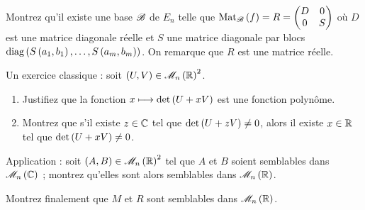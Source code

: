 \begin{corr}
\end{corr}

\begin{q}
Montrez qu'il existe une base \(\mathscr{B}\) de \(E_n\) telle que \(\Mat{f}=R=\begin{pmatrix}D & 0 \\ 0 & S\end{pmatrix}\) où \(D\) est une matrice diagonale réelle et \(S\) une matrice diagonale par blocs \(\operatorname{diag}\left(S\left(a_1,b_1\right),\dots,S\left(a_m,b_m\right)\right)\). On remarque que \(R\) est une matrice réelle.
\end{q}

\begin{corr}
\end{corr}

\begin{q}
Un exercice classique : soit \(\paren{U,V}\in\M{n}[\R]^2\).

\begin{enumerate}
    \item Justifiez que la fonction \(x\longmapsto\det\left(U+xV\right)\) est une fonction polynôme. \\
    \item Montrez que s'il existe \(z\in\mathbb{C}\) tel que \(\det\left(U+zV\right)\not=0\), alors il existe \(x\in\mathbb{R}\) tel que \(\det\left(U+xV\right)\not=0\).
\end{enumerate}

Application : soit \(\paren{A,B}\in\M{n}[\R]^2\) tel que \(A\) et \(B\) soient semblables dans \(\M{n}[\C]\) ; montrez qu'elles sont alors semblables dans \(\M{n}[\R]\).
\end{q}

\begin{corr}
\end{corr}

\begin{q}
Montrez finalement que \(M\) et \(R\) sont semblables dans \(\M{n}[\R]\).
\end{q}

\begin{corr}
\end{corr}
